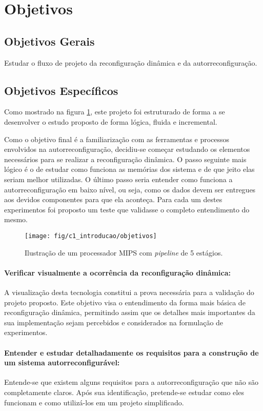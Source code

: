 \documentclass[11pt,a4paper,oneside]{book}
\begin{document}
\section{Objetivos}
\subsection{Objetivos Gerais} Estudar o fluxo de projeto da reconfiguração dinâmica e da autorreconfiguração.

\subsection{Objetivos Específicos}
\label{sec:obj:esp}
Como mostrado na figura \ref{fig:objetivos}, este projeto foi estruturado de forma a se desenvolver o estudo proposto de forma lógica, fluida e incremental.

Como o objetivo final é a familiarização com as ferramentas e processos envolvidos na autorreconfiguração, decidiu-se começar estudando os elementos necessários para se realizar a reconfiguração dinâmica.
O passo seguinte mais lógico é o de estudar como funciona as memórias dos sistema e de que jeito elas seriam melhor utilizadas.
O último passo seria entender como funciona a autorreconfiguração em baixo nível, ou seja, como os dados devem ser entregues aos devidos componentes para que ela aconteça.
Para cada um destes experimentos foi proposto um teste que validasse o completo entendimento do mesmo.

\begin{figure}[h]
\centering
\texttt{[image: fig/c1\_introducao/objetivos]}
\caption{Ilustração de um processador MIPS com \textit{pipeline} de 5 estágios.}
\label{fig:objetivos}
\end{figure}

\paragraph{Verificar visualmente a ocorrência da reconfiguração dinâmica:} A visualização desta tecnologia constitui a prova necessária para a validação do projeto proposto.
Este objetivo visa o entendimento da forma mais básica de reconfiguração dinâmica, permitindo assim que os detalhes mais importantes da sua implementação sejam percebidos e considerados na formulação de experimentos.

\paragraph{Entender e estudar detalhadamente os requisitos para a construção de um sistema autorreconfigurável:} Entende-se que existem alguns requisitos para a autorreconfiguração que não são completamente claros. Após sua identificação, pretende-se estudar como eles funcionam e como utilizá-los em um projeto simplificado.
\end{document}
